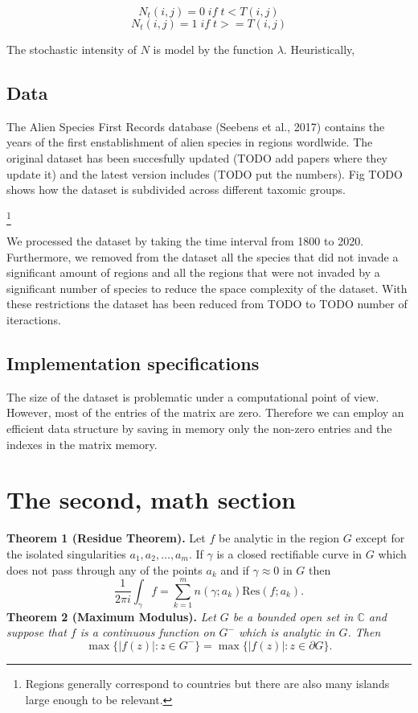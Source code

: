\documentclass[mscthesis]{usiinfthesis}
\begin{document}
\[
N_t(i, j) = 0 \; if \; t < T(i, j)
\]
\[
N_t(i, j) = 1 \; if \; t >= T(i, j)
\]

The stochastic intensity of $N$ is model by the function $\lambda$. Heuristically, 

\subsection{Data}

The Alien Species First Records database (Seebens et al., 2017) contains the years of the first enstablishment of alien species in regions wordlwide. The original dataset has been succesfully updated (TODO add papers where they update it) and the latest version includes (TODO put the numbers). Fig TODO shows how the dataset is subdivided across different taxomic groups. 


\footnote{Regions generally correspond to countries but there are also many islands large enough to be relevant.}

We processed the dataset by taking the time interval from 1800 to 2020. Furthermore, we removed from the dataset all the species that did not invade a significant amount of regions and all the regions that were not invaded by a significant number of species to reduce the space complexity of the dataset. With these restrictions the dataset has been reduced from TODO to TODO number of iteractions.


\subsection{Implementation specifications}
The size of the dataset is problematic under a computational point of view. However, most of the entries of the matrix are zero. Therefore we can employ an efficient data structure by saving in memory only the non-zero entries and the indexes in the matrix memory. 

\section{The second, math section}

\textbf{Theorem 1 (Residue Theorem).}
Let $f$ be analytic in the region $G$ except for the isolated singularities $a_1,a_2,\ldots,a_m$. If $\gamma$ is a closed rectifiable curve in $G$ which does not pass through any of the points $a_k$ and if $\gamma\approx 0$ in $G$ then
\[
\frac{1}{2\pi i}\int_\gamma f = \sum_{k=1}^m n(\gamma;a_k) \text{Res}(f;a_k).
\]
\textbf{Theorem 2 (Maximum Modulus).}
\emph{Let $G$ be a bounded open set in $\mathbb{C}$ and suppose that $f$ is a continuous function on $G^-$ which is analytic in $G$. Then}
\[
\max\{|f(z)|:z\in G^-\}=\max \{|f(z)|:z\in \partial G \}.
\]
\end{document}
